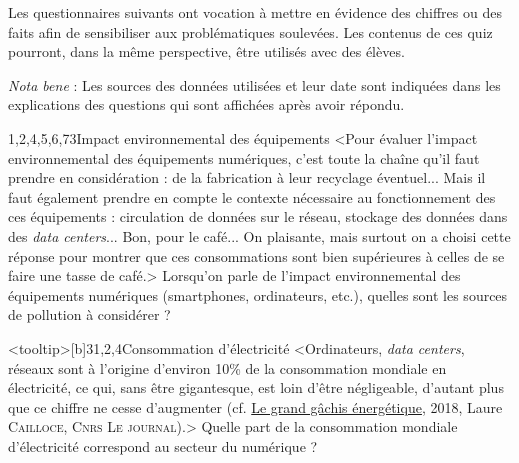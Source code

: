 \begin{quiz}[title={Numérique et environnement}]
Les questionnaires suivants ont vocation à mettre en évidence des chiffres ou des faits afin de sensibiliser aux problématiques soulevées. Les contenus de ces quiz pourront, dans la même perspective, être utilisés avec des élèves.

\textit{Nota bene} : Les sources des données utilisées et leur date sont indiquées dans les explications des questions qui sont affichées après avoir répondu.

\begin{quizquestion}[t]{1,2,4,5,6,7}{3}{Impact environnemental des équipements}
<Pour évaluer l'impact environnemental des équipements numériques, c'est toute la chaîne qu'il faut prendre en considération : de la fabrication à leur recyclage éventuel... Mais il faut également prendre en compte le contexte nécessaire au fonctionnement des ces équipements : circulation de données sur le réseau, stockage des données dans des \textit{data centers}... Bon, pour le café... On plaisante, mais surtout on a choisi cette réponse pour montrer que ces consommations sont bien supérieures à celles de se faire une tasse de café.>
Lorsqu'on parle de l'impact environnemental des équipements numériques (smartphones, ordinateurs, etc.), quelles sont les sources de pollution à considérer ? 
\end{quizquestion}

\begin{quizquestion*}<tooltip>[b]{3}{1,2,4}{Consommation d'électricité}
<Ordinateurs, \textit{data centers}, réseaux sont à l'origine d'environ 10\% de la consommation mondiale en électricité, ce qui, sans être gigantesque, est loin d'être négligeable, d'autant plus que ce chiffre ne cesse d’augmenter (cf. \href{https://lejournal.cnrs.fr/articles/numerique-le-grand-gachis-energetique}{Le grand gâchis énergétique}, 2018, Laure \textsc{Cailloce}, \textsc{Cnrs Le journal}).>
Quelle part de la consommation mondiale d’électricité correspond au secteur du numérique ?
\end{quizquestion*}


\end{quiz}
